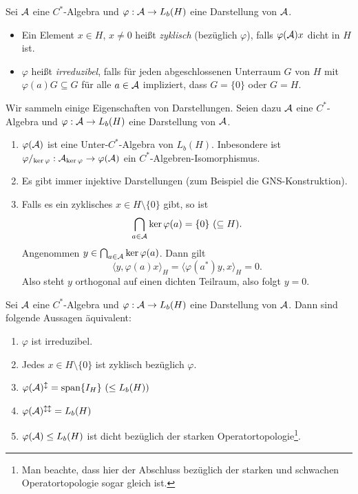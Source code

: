\begin{definition}
    Sei $\mathcal{A}$ eine $C^*$-Algebra und $\varphi : \mathcal{A} \to L_b(H)$ eine Darstellung von $\mathcal{A}$.
    \begin{itemize}
        \item Ein Element $x \in H$, $x \neq 0$ heißt \emph{zyklisch} (bezüglich $\varphi$), falls $\varphi(\mathcal{A}) x$ dicht in $H$ ist.
        \item $\varphi$ heißt \emph{irreduzibel}, falls für jeden abgeschlossenen Unterraum $G$ von $H$ mit $\varphi(a)G \subseteq G$ für alle $a \in \mathcal{A}$ impliziert, dass $G = \{ 0 \}$ oder $G = H$.
    \end{itemize}
\end{definition}

\begin{remark}
    Wir sammeln einige Eigenschaften von Darstellungen. Seien dazu $\mathcal{A}$ eine $C^*$-Algebra und $\varphi : \mathcal{A} \to L_b(H)$ eine Darstellung von $\mathcal{A}$.
    \begin{enumerate}
        \item $\varphi(\mathcal{A})$ ist eine Unter-$C^*$-Algebra von $L_b(H)$. Inbesondere ist $\varphi/_{\ker \varphi} : \mathcal{A}_{\ker \varphi} \to \varphi(\mathcal{A})$ ein $C^*$-Algebren-Isomorphismus.
        
        \item Es gibt immer injektive Darstellungen (zum Beispiel die GNS-Konstruktion).
        
        \item Falls es ein zyklisches $x \in H \setminus \{0\}$ gibt, so ist
        \[
            \bigcap_{a \in \mathcal{A}} \ker \varphi(a) = \{ 0 \} \ (\subseteq H).
        \]
        Angenommen $y \in \bigcap_{a \in \mathcal{A}} \ker \varphi(a)$. Dann gilt
        \[
            \langle y, \varphi(a) x \rangle_H
            =
            \langle \varphi(a^*) y, x \rangle_H
            =
            0.
        \]
        Also steht $y$ orthogonal auf einen dichten Teilraum, also folgt $y = 0$.
    \end{enumerate}
\end{remark}

\begin{theorem}
    Sei $\mathcal{A}$ eine $C^*$-Algebra und $\varphi : \mathcal{A} \to L_b(H)$ eine Darstellung von $\mathcal{A}$. Dann sind folgende Aussagen äquivalent:
    \begin{enumerate}[label=(\roman*)]
        \item $\varphi$ ist irreduzibel.
        \item Jedes $x \in H \setminus \{0\}$ ist zyklisch bezüglich $\varphi$.
        \item $\varphi(\mathcal{A})^{\updownarrow} = \mathrm{span} \{ I_H \} \ (\leq L_b(H))$
        \item $\varphi(\mathcal{A})^{\updownarrow \updownarrow} = L_b(H)$
        \item $\varphi(\mathcal{A}) \leq L_b(H)$ ist dicht bezüglich der starken Operatortopologie\footnote{Man beachte, dass hier der Abschluss bezüglich der starken und schwachen Operatortopologie sogar gleich ist.}.
    \end{enumerate}
\end{theorem}